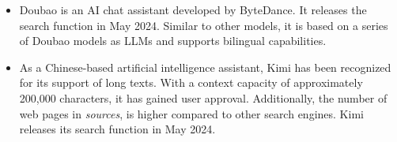 \begin{itemize}[leftmargin=*]
    \item {} Doubao is an AI chat assistant developed by ByteDance. It releases the search function in May 2024.
    Similar to other models, it is based on a series of Doubao models as LLMs and supports bilingual capabilities.
    \item {} As a Chinese-based artificial intelligence assistant, Kimi has been recognized for its support of long texts.
    With a context capacity of approximately 200,000 characters, it has gained user approval. Additionally, the number of web pages in \textit{sources}, is higher compared to other search engines.
    Kimi releases its search function in May 2024.
\end{itemize}